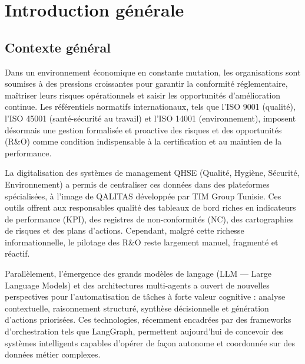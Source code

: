 \chapter*{Introduction générale}

\section*{Contexte général}

Dans un environnement économique en constante mutation, les organisations sont soumises à des pressions croissantes pour garantir la conformité réglementaire, maîtriser leurs risques opérationnels et saisir les opportunités d'amélioration continue. Les référentiels normatifs internationaux, tels que l'ISO 9001 (qualité), l'ISO 45001 (santé-sécurité au travail) et l'ISO 14001 (environnement), imposent désormais une gestion formalisée et proactive des risques et des opportunités (R\&O) comme condition indispensable à la certification et au maintien de la performance.

La digitalisation des systèmes de management QHSE (Qualité, Hygiène, Sécurité, Environnement) a permis de centraliser ces données dans des plateformes spécialisées, à l'image de QALITAS développée par TIM Group Tunisie. Ces outils offrent aux responsables qualité des tableaux de bord riches en indicateurs de performance (KPI), des registres de non-conformités (NC), des cartographies de risques et des plans d'actions. Cependant, malgré cette richesse informationnelle, le pilotage des R\&O reste largement manuel, fragmenté et réactif.

Parallèlement, l'émergence des grands modèles de langage (LLM — Large Language Models) et des architectures multi-agents a ouvert de nouvelles perspectives pour l'automatisation de tâches à forte valeur cognitive : analyse contextuelle, raisonnement structuré, synthèse décisionnelle et génération d'actions priorisées. Ces technologies, récemment encadrées par des frameworks d'orchestration tels que LangGraph, permettent aujourd'hui de concevoir des systèmes intelligents capables d'opérer de façon autonome et coordonnée sur des données métier complexes.

